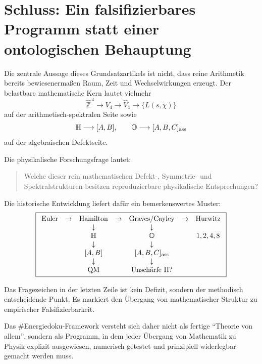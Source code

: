\documentclass[11pt,a4paper]{article}
\newcommand{\OO}{\mathbb O}
\newcommand{\HH}{\mathbb H}
\newcommand{\ZZ}{\mathbb Z}
\begin{document}
\section{Schluss: Ein falsifizierbares Programm statt einer ontologischen Behauptung}
Die zentrale Aussage dieses Grundsatzartikels ist nicht, dass reine Arithmetik bereits bewiesenermaßen Raum, Zeit und Wechselwirkungen erzeugt. Der belastbare mathematische Kern lautet vielmehr
\[
\widehat{\ZZ}^{\,4}\longrightarrow V_4\longrightarrow\widehat V_4\longrightarrow\{L(s,\chi)\}
\]
auf der arithmetisch-spektralen Seite sowie
\[
\HH\longrightarrow[A,B],\qquad \OO\longrightarrow[A,B,C]_{\rm ass}
\]
auf der algebraischen Defektseite.

Die physikalische Forschungsfrage lautet:
\begin{quote}
Welche dieser rein mathematischen Defekt-, Symmetrie- und Spektralstrukturen besitzen reproduzierbare physikalische Entsprechungen?
\end{quote}

Die historische Entwicklung liefert dafür ein bemerkenswertes Muster:
\[
\boxed{
\begin{array}{ccccccc}
\text{Euler}&\to&\text{Hamilton}&\to&\text{Graves/Cayley}&\to&\text{Hurwitz}\\
&&\downarrow&&\downarrow&&\\
&&\HH&&\OO&&1,2,4,8\\
&&\downarrow&&\downarrow&&\\
&&[A,B]&&[A,B,C]_{\rm ass}\\
&&\downarrow&&\downarrow&&\\
&&\text{QM}&&\text{Unschärfe II?}
\end{array}}
\]

Das Fragezeichen in der letzten Zeile ist kein Defizit, sondern der methodisch entscheidende Punkt. Es markiert den Übergang von mathematischer Struktur zu empirischer Falsifizierbarkeit.

Das \#Energiedoku-Framework versteht sich daher nicht als fertige ``Theorie von allem'', sondern als Programm, in dem jeder Übergang von Mathematik zu Physik explizit ausgewiesen, numerisch getestet und prinzipiell widerlegbar gemacht werden muss.
\end{document}
